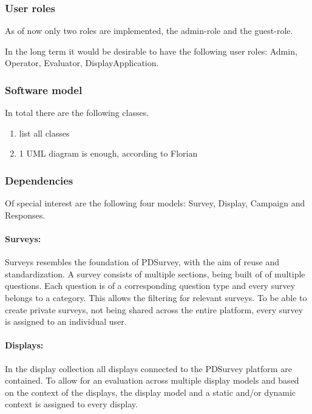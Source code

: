 \subsubsection{User roles}

As of now only two roles are implemented, the admin-role and the guest-role.



In the long term it would be desirable to have the following user roles: Admin, Operator, Evaluator, DisplayApplication.






\subsubsection{Software model}

In total there are the following classes.

\begin{enumerate}
\item list all classes
\item 1 UML diagram is enough, according to Florian
\end{enumerate}


\subsubsection{Dependencies}

Of special interest are the following four models: Survey, Display, Campaign and Responses.

\paragraph{Surveys:} Surveys resembles the foundation of PDSurvey, with the aim of reuse and standardization. A survey consists of multiple sections, being built of of multiple questions. Each question is of a corresponding question type and every survey belongs to a category. This allows the filtering for relevant surveys. To be able to create private surveys, not being shared across the entire platform, every survey is assigned to an individual user.

\paragraph{Displays:} In the display collection all displays connected to the PDSurvey platform are contained. To allow for an evaluation across multiple display models and based on the context of the displays, the display model and a static and/or dynamic context is assigned to every display.

